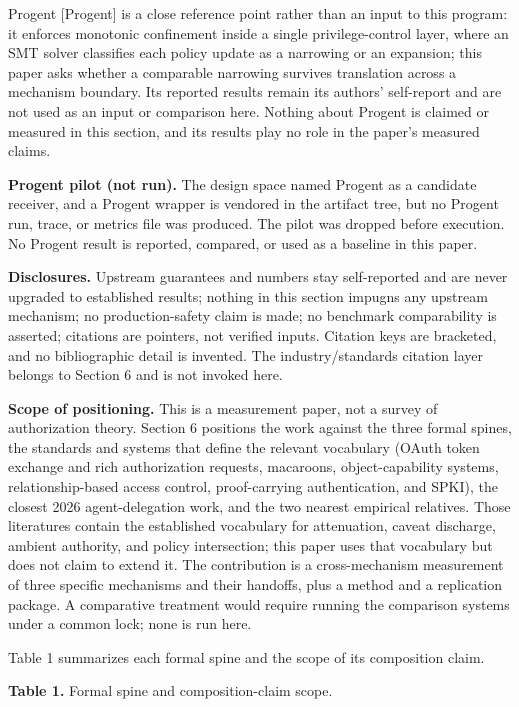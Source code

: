 \documentclass[
  10pt,
]{article}
\newcounter{none} %
\renewcommand{\_}{\allowbreak\origunderscore}
\begin{document}
Progent {[}Progent{]} is a close reference point rather than an input to
this program: it enforces monotonic confinement inside a single
privilege-control layer, where an SMT solver classifies each policy
update as a narrowing or an expansion; this paper asks whether a
comparable narrowing survives translation across a mechanism boundary.
Its reported results remain its authors' self-report and are not used as
an input or comparison here. Nothing about Progent is claimed or
measured in this section, and its results play no role in the paper's
measured claims.

\textbf{Progent pilot (not run).} The design space named Progent as a
candidate receiver, and a Progent wrapper is vendored in the artifact
tree, but no Progent run, trace, or metrics file was produced. The pilot
was dropped before execution. No Progent result is reported, compared,
or used as a baseline in this paper.

\textbf{Disclosures.} Upstream guarantees and numbers stay self-reported
and are never upgraded to established results; nothing in this section
impugns any upstream mechanism; no production-safety claim is made; no
benchmark comparability is asserted; citations are pointers, not
verified inputs. Citation keys are bracketed, and no bibliographic
detail is invented. The industry/standards citation layer belongs to
Section 6 and is not invoked here.

\textbf{Scope of positioning.} This is a measurement paper, not a survey
of authorization theory. Section 6 positions the work against the three
formal spines, the standards and systems that define the relevant
vocabulary (OAuth token exchange and rich authorization requests,
macaroons, object-capability systems, relationship-based access control,
proof-carrying authentication, and SPKI), the closest 2026
agent-delegation work, and the two nearest empirical relatives. Those
literatures contain the established vocabulary for attenuation, caveat
discharge, ambient authority, and policy intersection; this paper uses
that vocabulary but does not claim to extend it. The contribution is a
cross-mechanism measurement of three specific mechanisms and their
handoffs, plus a method and a replication package. A comparative
treatment would require running the comparison systems under a common
lock; none is run here.

Table 1 summarizes each formal spine and the scope of its composition
claim.

\textbf{Table 1.} Formal spine and composition-claim scope.
\end{document}
